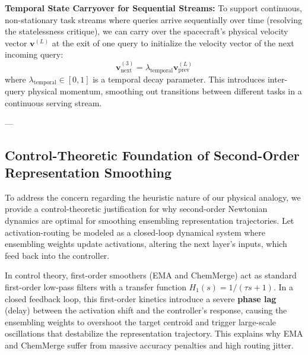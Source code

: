 \textbf{Temporal State Carryover for Sequential Streams: } To support continuous, non-stationary task streams where queries arrive sequentially over time (resolving the statelessness critique), we can carry over the spacecraft's physical velocity vector $\mathbf{v}^{(L)}$ at the exit of one query to initialize the velocity vector of the next incoming query:
\vspace{-3pt}
\begin{equation}
    \mathbf{v}^{(3)}_{\text{next}} = \lambda_{\text{temporal}} \mathbf{v}^{(L)}_{\text{prev}}
    \label{eq:temporal_carryover}
\end{equation}
\vspace{-3pt}
where $\lambda_{\text{temporal}} \in [0, 1]$ is a temporal decay parameter. This introduces inter-query physical momentum, smoothing out transitions between different tasks in a continuous serving stream.

---

\vspace{-5pt}
\subsection{Control-Theoretic Foundation of Second-Order Representation Smoothing}
\label{sec:control_theoretic}
To address the concern regarding the heuristic nature of our physical analogy, we provide a control-theoretic justification for why second-order Newtonian dynamics are optimal for smoothing ensembling representation trajectories. Let activation-routing be modeled as a closed-loop dynamical system where ensembling weights update activations, altering the next layer's inputs, which feed back into the controller.

In control theory, first-order smoothers (EMA and ChemMerge) act as standard first-order low-pass filters with a transfer function $H_1(s) = 1 / (\tau s + 1)$. In a closed feedback loop, this first-order kinetics introduce a severe \textbf{phase lag} (delay) between the activation shift and the controller's response, causing the ensembling weights to overshoot the target centroid and trigger large-scale oscillations that destabilize the representation trajectory. This explains why EMA and ChemMerge suffer from massive accuracy penalties and high routing jitter.

